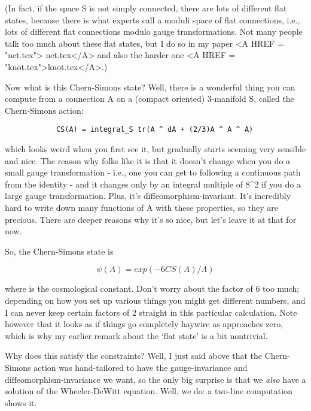 (In fact, if the space S is not simply connected, there are lots of 
different flat states, because there is what experts call a moduli 
space of flat connections, i.e., lots of different flat connections 
modulo gauge transformations.  Not many people talk too much 
about these flat states, but I do so in my paper <A HREF = "net.tex">
net.tex</A> and also 
the harder one <A HREF = "knot.tex">knot.tex</A>.)

Now what is this Chern-Simons state?  Well, there is a wonderful
thing you can compute from a connection A on a (compact oriented)
3-manifold S, called the Chern-Simons action:

\begin{verbatim}
            CS(A) = integral_S tr(A ^ dA + (2/3)A ^ A ^ A)
\end{verbatim}
    

which looks weird when you first see it, but gradually starts seeming
very sensible and nice.  The reason why folks like it is that it doesn't
change when you do a small gauge transformation - i.e., one you
can get to following a continuous path from the identity - and it
changes only by an integral multiple of 8\pi ^2 if you do a large
gauge transformation.  Plus, it's diffeomorphism-invariant.  It's
incredibly hard to write down many functions of A with these properties,
so they are precious.  There are deeper reasons why it's so nice, but
let's leave it at that for now.

So, the Chern-Simons state is

$$
                \psi (A) = exp(-6 CS(A)/\Lambda )
$$
    

where \Lambda  is the cosmological constant.  Don't worry
about the factor of 6 too much; depending on how you set up
various things you might get different numbers, and I can
never keep certain factors of 2 straight in this particular
calculation.  Note however that it looks as if things go 
completely haywire as \Lambda  approaches zero, which is why 
my earlier remark about the `flat state' is a bit nontrivial.  

Why does this satisfy the constraints?  Well, I just said above
that the Chern-Simons action was hand-tailored to have the
gauge-invariance and diffeomorphism-invariance we want, so the
only big surprise is that we \emph{also} have a solution of the
Wheeler-DeWitt equation.  Well, we do: a two-line computation
shows it.  

